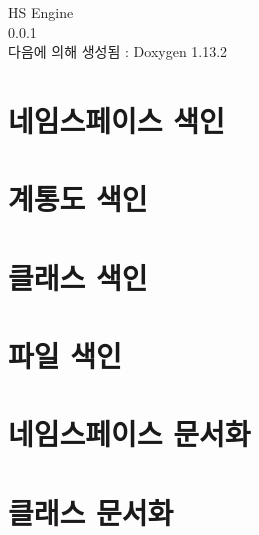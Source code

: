 \documentclass[twoside]{book}
\newcommand{\+}{\discretionary{\mbox{\scriptsize$\hookleftarrow$}}{}{}}
\newcommand{\clearemptydoublepage}{%
    \newpage{\pagestyle{empty}\cleardoublepage}%
  }
\begin{document}
  \raggedbottom
    \hypersetup{pageanchor=false,
                bookmarksnumbered=true,
                pdfencoding=unicode
               }
  \begin{titlepage}
  \vspace*{7cm}
  \begin{center}%
  {\Large HS Engine}\\
  [1ex]\large 0.\+0.\+1 \\
  \vspace*{1cm}
  {\large 다음에 의해 생성됨 \+:  Doxygen 1.13.2}\\
  \end{center}
  \end{titlepage}
  \clearemptydoublepage
  \tableofcontents
  \clearemptydoublepage
  \hypersetup{pageanchor=true}

\chapter{네임스페이스 색인}

\chapter{계통도 색인}

\chapter{클래스 색인}

\chapter{파일 색인}

\chapter{네임스페이스 문서화}






\chapter{클래스 문서화}





























\end{document}
